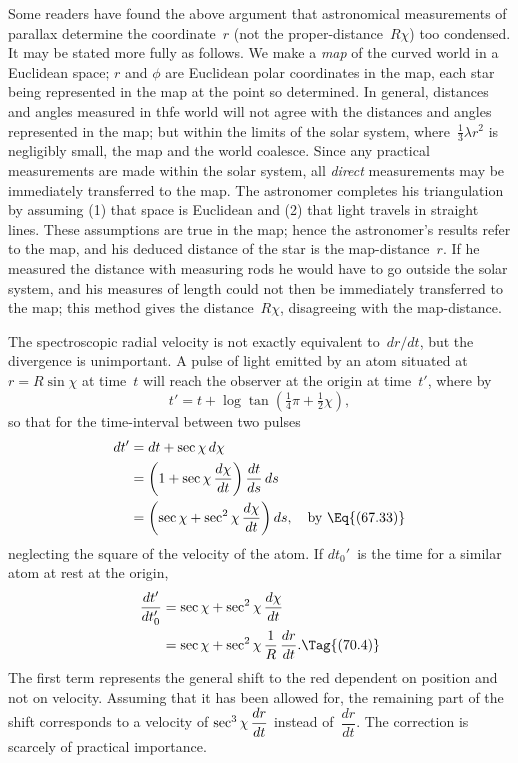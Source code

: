 \documentclass[12pt]{book}
\begin{document}
Some readers have found the above argument that astronomical measurements of parallax determine the coordinate~$r$
(not the proper-distance~$R\chi$) too condensed.
It may be stated more fully as follows.
We make a \emph{map} of the curved world in a Euclidean space;
$r$ and $\phi$ are Euclidean polar coordinates in the map, each star being represented in the map at
the point so determined.
In general, distances and angles measured in thfe world will not agree with the distances and angles represented in
the map; but within the limits of the solar system, where~$\tfrac{1}{3}\lambda r^2$ is negligibly small,
the map and the world coalesce.
Since any practical measurements are made within the solar system, all \emph{direct} measurements may be immediately
transferred to the map.
The astronomer completes his triangulation by assuming (1) that space is Euclidean and (2) that light travels in
straight lines.
These assumptions are true in the map; hence the astronomer's results refer to the map, and his deduced distance
of the star is the map\hyp{}distance~$r$.
If he measured the distance with measuring rods he would have to go outside the solar system, and his measures
of length could not then be immediately transferred to the map;
this method gives the distance~$R\chi$, disagreeing with the map\hyp{}distance.

The spectroscopic radial velocity is not exactly equivalent to~$dr/dt$, but
%
the divergence is unimportant. A pulse of light emitted by an atom situated
at $r = R\sin\chi$ at time~$t$ will reach the observer at the origin at time~$t'$, where
by~
\[
t' = t + \log\tan(\tfrac{1}{4}\pi + \tfrac{1}{2}\chi),
\]
so that for the time-interval between two pulses
\begin{align*}
dt' &= dt + \sec\chi\, d\chi \\
&= \left(1 + \sec\chi\, \frac{d\chi}{dt}\right) \frac{dt}{ds}\, ds \\
&= \left(\sec\chi + \sec^{2}\chi\, \frac{d\chi}{dt}\right) ds,
\quad\text{by~\Eq{(67.33)}}
\end{align*}
%
neglecting the square of the velocity of the atom. If $dt_{0}'$~is the time for a
similar atom at rest at the origin,
\begin{align*}
  \frac{dt'}{dt_{0}'}
  &= \sec\chi + \sec^{2}\chi\, \frac{d\chi}{dt} \\
  &= \sec\chi + \sec^{2}\chi\, \frac{1}{R}\, \frac{dr}{dt}.
  \Tag{(70.4)}
\end{align*}
The first term represents the general shift to the red dependent on position
and not on velocity. Assuming that it has been allowed for, the remaining
part of the shift corresponds to a velocity of $\smash[b]{\sec^{3}\chi\, \dfrac{dr}{dt}}$ instead of~$\dfrac{dr}{dt}$. The
correction is scarcely of practical importance.
\end{document}
